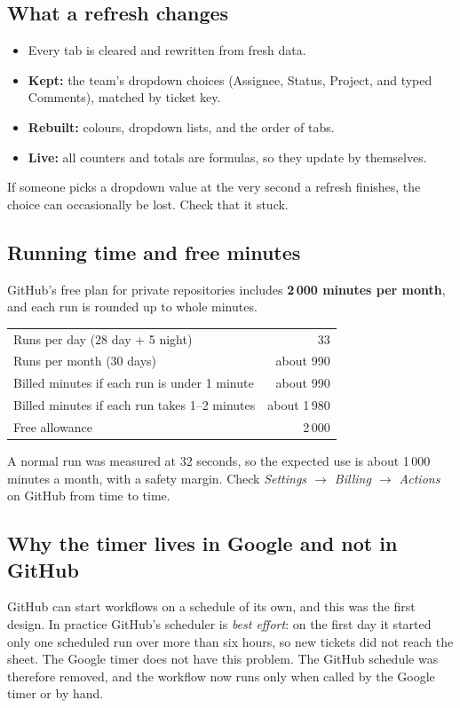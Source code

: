 \documentclass[11pt,a4paper]{article}
\let\oldsubsection\subsection
\renewcommand{\subsection}{\needspace{7\baselineskip}\oldsubsection}
\begin{document}
\subsection{What a refresh changes}
\begin{itemize}
  \item Every tab is cleared and rewritten from fresh data.
  \item \textbf{Kept:} the team's dropdown choices (Assignee, Status, Project, and typed Comments), matched by ticket key.
  \item \textbf{Rebuilt:} colours, dropdown lists, and the order of tabs.
  \item \textbf{Live:} all counters and totals are formulas, so they update by themselves.
\end{itemize}
If someone picks a dropdown value at the very second a refresh finishes, the choice can occasionally be lost. Check that
it stuck.

\subsection{Running time and free minutes}
\label{sec:minutes}
GitHub's free plan for private repositories includes \textbf{2\,000 minutes per month}, and each run is rounded up to
whole minutes.

\begin{center}
\begin{tabular}{@{}lr@{}}
\toprule
Runs per day (28 day + 5 night) & 33 \\
Runs per month (30 days) & about 990 \\
Billed minutes if each run is under 1 minute & about 990 \\
Billed minutes if each run takes 1--2 minutes & about 1\,980 \\
Free allowance & 2\,000 \\
\bottomrule
\end{tabular}
\end{center}
A normal run was measured at 32 seconds, so the expected use is about 1\,000 minutes a month, with a safety margin.
Check \emph{Settings $\rightarrow$ Billing $\rightarrow$ Actions} on GitHub from time to time.

\subsection{Why the timer lives in Google and not in GitHub}
GitHub can start workflows on a schedule of its own, and this was the first design. In practice GitHub's scheduler is
\emph{best effort}: on the first day it started only one scheduled run over more than six hours, so new tickets did not
reach the sheet. The Google timer does not have this problem. The GitHub schedule was therefore removed, and the
workflow now runs only when called by the Google timer or by hand.
\end{document}
